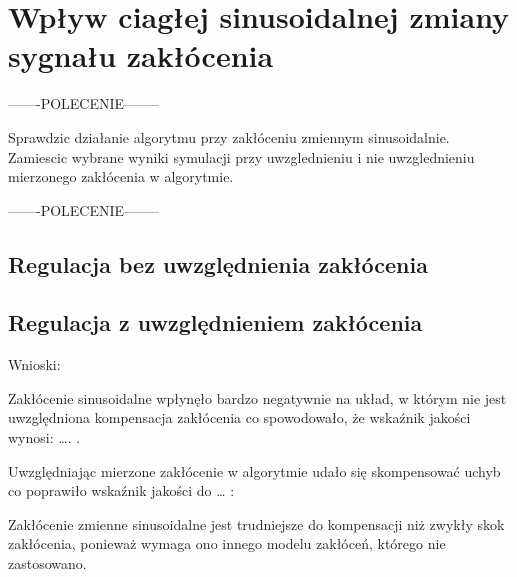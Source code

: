 \section{Wpływ ciagłej sinusoidalnej zmiany sygnału zakłócenia}

-------POLECENIE--------

Sprawdzic działanie algorytmu przy zakłóceniu zmiennym sinusoidalnie. Zamiescic wybrane
wyniki symulacji przy uwzglednieniu i nie uwzglednieniu mierzonego zakłócenia
w algorytmie.

-------POLECENIE--------


\subsection{Regulacja bez uwzględnienia zakłócenia}

\subsection{Regulacja z uwzględnieniem zakłócenia}

Wnioski: 

Zakłócenie sinusoidalne wpłynęło bardzo negatywnie na układ, 
w którym nie jest uwzględniona kompensacja zakłócenia co spowodowało, 
że wskaźnik jakości wynosi: …. . 

Uwzględniając mierzone zakłócenie w algorytmie udało się skompensować uchyb co poprawiło wskaźnik jakości do … :

Zakłócenie zmienne sinusoidalne jest trudniejsze do kompensacji niż zwykły skok zakłócenia, 
ponieważ wymaga ono innego modelu zakłóceń, którego nie zastosowano.

